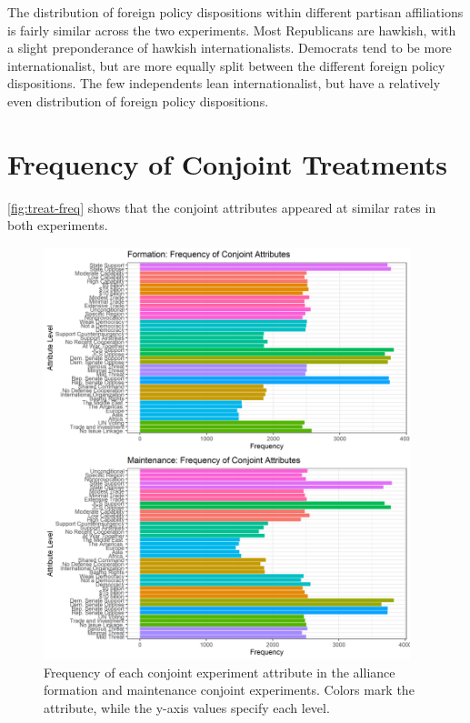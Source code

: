\documentclass[12pt]{article}
\begin{document}
The distribution of foreign policy dispositions within different partisan affiliations is fairly similar across the two experiments. 
Most Republicans are hawkish, with a slight preponderance of hawkish internationalists. 
Democrats tend to be more internationalist, but are more equally split between the different foreign policy dispositions. 
The few independents lean internationalist, but have a relatively even distribution of foreign policy dispositions. 



\newpage


\section{Frequency of Conjoint Treatments}

\autoref{fig:treat-freq} shows that the conjoint attributes appeared at similar rates in both experiments. 
 
\begin{figure}[htbp]
	\centering
		\includegraphics[width=0.95\textwidth]{treat-freq.png}
	\caption{Frequency of each conjoint experiment attribute in the alliance formation and maintenance conjoint experiments. Colors mark the attribute, while the y-axis values specify each level.}
	\label{fig:treat-freq}
\end{figure}


\newpage 
 
 
\end{document}
